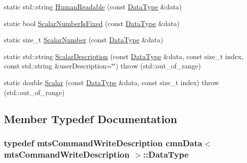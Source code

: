 \begin{DoxyCompactItemize}
\item 
static std\-::string \hyperlink{classcmn_data_3_01mts_command_write_description_01_4_a7e9f00c746314d13dce2ae0128e1d58f}{Human\-Readable} (const \hyperlink{classcmn_data_3_01mts_command_write_description_01_4_aed29f1a95e5884bf865916b40933e824}{Data\-Type} \&data)
\item 
static bool \hyperlink{classcmn_data_3_01mts_command_write_description_01_4_a3b6800d2d272de63979b70feb4bdf78d}{Scalar\-Number\-Is\-Fixed} (const \hyperlink{classcmn_data_3_01mts_command_write_description_01_4_aed29f1a95e5884bf865916b40933e824}{Data\-Type} \&data)
\item 
static size\-\_\-t \hyperlink{classcmn_data_3_01mts_command_write_description_01_4_a3be9ee1c9e548f685258fad97fa8f5db}{Scalar\-Number} (const \hyperlink{classcmn_data_3_01mts_command_write_description_01_4_aed29f1a95e5884bf865916b40933e824}{Data\-Type} \&data)
\item 
static std\-::string \hyperlink{classcmn_data_3_01mts_command_write_description_01_4_ae6292faf353c668a51ce0b274bef29bc}{Scalar\-Description} (const \hyperlink{classcmn_data_3_01mts_command_write_description_01_4_aed29f1a95e5884bf865916b40933e824}{Data\-Type} \&data, const size\-\_\-t index, const std\-::string \&user\-Description=\char`\"{}\char`\"{})  throw (std\-::out\-\_\-of\-\_\-range)
\item 
static double \hyperlink{classcmn_data_3_01mts_command_write_description_01_4_a273a03350154294f65d6f0f503324076}{Scalar} (const \hyperlink{classcmn_data_3_01mts_command_write_description_01_4_aed29f1a95e5884bf865916b40933e824}{Data\-Type} \&data, const size\-\_\-t index)  throw (std\-::out\-\_\-of\-\_\-range)
\end{DoxyCompactItemize}


\subsection{Member Typedef Documentation}
\hypertarget{classcmn_data_3_01mts_command_write_description_01_4_aed29f1a95e5884bf865916b40933e824}{
\subsubsection[{Data\-Type}]{\setlength{\rightskip}{0pt plus 5cm}typedef {\bf mts\-Command\-Write\-Description} {\bf cmn\-Data}$<$ {\bf mts\-Command\-Write\-Description} $>$\-::{\bf Data\-Type}}}\label{classcmn_data_3_01mts_command_write_description_01_4_aed29f1a95e5884bf865916b40933e824}


